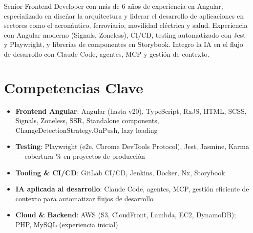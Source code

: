 \documentclass[11pt,a4paper,sans]{moderncv}
\begin{document}
\makecvtitle


\vspace{6pt}
\small{Senior Frontend Developer con más de 6 años de experiencia en Angular, especializado en diseñar la arquitectura y liderar el desarrollo de aplicaciones en sectores como el aeronáutico, ferroviario, movilidad eléctrica y salud. Experiencia con Angular moderno (Signals, Zoneless), CI/CD, testing automatizado con Jest y Playwright, y librerías de componentes en Storybook. Integro la IA en el flujo de desarrollo con Claude Code, agentes, MCP y gestión de contexto.}


\section{Competencias Clave}
\vspace{1pt}
\begin{itemize}

\item \textbf{Frontend Angular}: Angular (hasta v20), TypeScript, RxJS, HTML, SCSS, Signals, Zoneless, SSR, Standalone components, ChangeDetectionStrategy.OnPush, lazy loading

\item \textbf{Testing}: Playwright (e2e, Chrome DevTools Protocol), Jest, Jasmine, Karma — cobertura \% en proyectos de producción

\item \textbf{Tooling \& CI/CD}: GitLab CI/CD, Jenkins, Docker, Nx, Storybook

\item \textbf{IA aplicada al desarrollo}: Claude Code, agentes, MCP, gestión eficiente de contexto para automatizar flujos de desarrollo

\item \textbf{Cloud \& Backend}: AWS (S3, CloudFront, Lambda, EC2, DynamoDB); PHP, MySQL (experiencia inicial)

\end{itemize}

\end{document}
